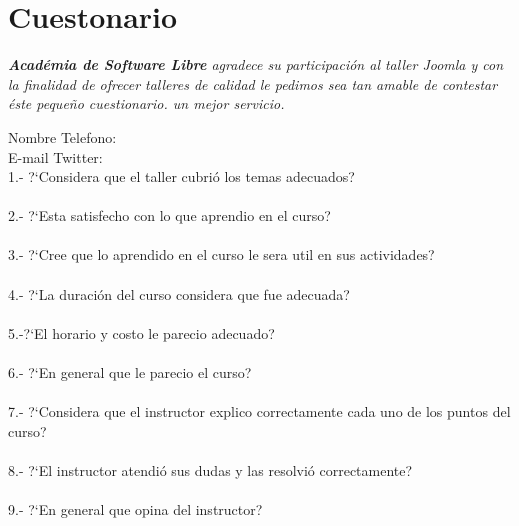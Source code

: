 \documentclass[ngerman,a4paper]{scrartcl}
\begin{document}
\section*{Cuestonario}
\emph{ \textbf{Acad\'emia de Software Libre} agradece su participaci\'on al taller Joomla y con la finalidad de ofrecer talleres de calidad le pedimos sea tan amable de contestar \'este peque\~no cuestionario. un mejor servicio.}\\

\begin{Form}
Nombre \TextField[name=nombre]{} Telefono: \TextField[name=telefono]{}\\
E-mail \TextField[name=mail]{} Twitter: \TextField[name=twitter]{}\\
1.- ?`Considera que el taller cubri\'o los temas adecuados?\\
\TextField[name=p1]{}\\

2.- ?`Esta satisfecho con lo que aprendio en el curso?\\
\TextField[name=p2]{}\\

3.- ?`Cree que lo aprendido en el curso le sera util en sus actividades?\\
\TextField[name=p3]{}\\

4.- ?`La duraci\'on del curso considera que fue adecuada?\\
\TextField[name=p4]{}\\

5.-?`El horario y costo  le parecio adecuado?\\
\TextField[name=p5]{}\\

6.- ?`En general que le parecio el curso?\\
\TextField[name=p6]{}\\

7.- ?`Considera que el instructor explico correctamente cada uno de los puntos del curso?\\
\TextField[name=p7]{}\\

8.- ?`El instructor atendi\'o sus dudas y las resolvi\'o correctamente?\\
\TextField[name=p8]{}\\

9.- ?`En general que opina del instructor?\\
\TextField[name=p9]{}\\


\end{Form}
\end{document}
